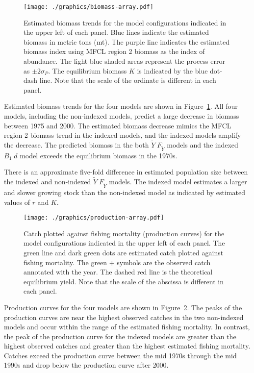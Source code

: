 \documentclass[12pt,letterpaper,twoside]{article}
\newcommand\MSY{\widetilde{Y}}
\newcommand\Fmsy{F_{\MSY}}
\newcommand\MSYFmsy{\MSY\;\Fmsy}
\newcommand\Bd{B_1\; d}
\begin{document}
\begin{figure}[h]
\begin{center}
\texttt{[image: ./graphics/biomass-array.pdf]}
\caption{\label{fig:estbiomass}
Estimated biomass trends for the model configurations indicated in
the upper left of each panel.
Blue lines indicate the estimated biomass in metric tons (mt).
The purple line indicates the estimated biomass index using MFCL
region 2 biomass as the index of abundance.
The light blue shaded areas represent the process error as 
$\pm 2\sigma_P$.
The equilibrium biomass $K$ is indicated by the blue dot-dash line.
Note that the scale of the ordinate is different in each panel.
}
\end{center}
\end{figure}

Estimated biomass trends for the four models are shown in
Figure~\ref{fig:estbiomass}.
All four models, including the non-indexed models, predict a large
decrease in biomass between 1975 and 2000. The estimated biomass
decrease mimics the MFCL region 2 biomass trend in the
indexed models, and the indexed models amplify the decrease. The
predicted biomass in the both $\MSYFmsy$ models
and the indexed $\Bd$ model exceeds the equilibrium biomass in the 1970s.
\pagebreak

There is an approximate five-fold difference in estimated population size
between the indexed and non-indexed $\MSYFmsy$ models.
The indexed model estimates a larger and slower growing stock than the
non-indexed model as indicated by estimated values of $r$ and $K$.

\begin{figure}[h]
\begin{center}
\texttt{[image: ./graphics/production-array.pdf]}
\caption{\label{fig:estprod}
Catch plotted against fishing mortality (production curves)
for the model configurations indicated in the upper left of each panel.
The green line and dark green dots are estimated catch plotted
against fishing mortality.
The green $+$ symbols are the observed catch annotated with the year.
The dashed red line is the theoretical equilibrium yield.
Note that the scale of the abscissa is different in each panel.
}
\end{center}
\end{figure}

\vbox{ %
Production curves for the four models are shown in
Figure~\ref{fig:estprod}.
The peaks of the production curves
are near the highest observed catches
in the two non-indexed models and occur within the range of the
estimated fishing mortality.
In contrast, the peak of the production curve for the indexed models
are greater than the highest observed catches and greater than
the highest estimated fishing mortality.
Catches exceed the production curve between the mid 1970s through the
mid 1990s and drop below the production curve after 2000.
}
\end{document}
